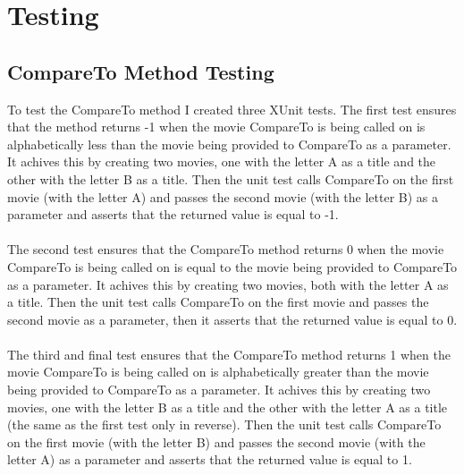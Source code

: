 \documentclass[12pt,a4paper]{article}
\begin{document}
		\newpage
	
	\section{Testing}
		\subsection{CompareTo Method Testing}
			To test the CompareTo method I created three XUnit tests. The first test 
			ensures that the method returns -1 when the movie CompareTo is being called 
			on is alphabetically less than the movie being provided to CompareTo as a 
			parameter. It achives this by creating two movies, one with the letter A as 
			a title and the other with the letter B as a title. Then the unit test calls 
			CompareTo on the first movie (with the letter A) and passes the second movie 
			(with the letter B) as a parameter and asserts that the returned value is equal 
			to -1.\\
			\\
			The second test ensures that the CompareTo method returns 0 when the movie 
			CompareTo is being called on is equal to the movie being provided to CompareTo 
			as a parameter. It achives this by creating two movies, both with the letter A 
			as a title. Then the unit test calls CompareTo on the first movie and passes the 
			second movie as a parameter, then it asserts that the returned value is equal to 
			0.\\
			\\
			The third and final test ensures that the CompareTo method returns 1 when the 
			movie CompareTo is being called on is alphabetically greater than the movie 
			being provided to CompareTo as a parameter. It achives this by creating two 
			movies, one with the letter B as a title and the other with the letter A as a 
			title (the same as the first test only in reverse). Then the unit test calls 
			CompareTo on the first movie (with the letter B) and passes the second movie 
			(with the letter A) as a parameter and asserts that the returned value is equal 
			to 1.\\
			
		\newpage
\end{document}
